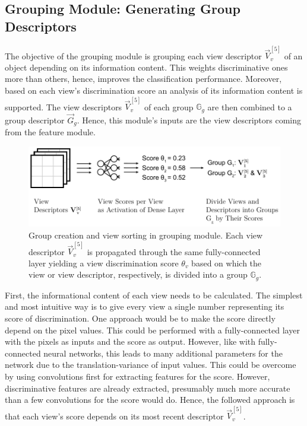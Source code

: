 \subsection{Grouping Module: Generating Group Descriptors}
\label{sec:architecture-grouping-module}
The objective of the grouping module is grouping each view descriptor $\vec{V}^{[5]}_v$ of an object depending on its information content.
This weights discriminative ones more than others, hence, improves the classification performance.
Moreover, based on each view's discrimination score an analysis of its information content is supported.
The view descriptors $\vec{V}^{[5]}_v$ of each group $\mathbb{G}_g$ are then combined to a group descriptor $\vec{G}_g$.
Hence, this module's inputs are the view descriptors coming from the feature module.
\begin{figure}
	\centering
	\includegraphics[]{images/grouping_module_groups.pdf}
	\caption{Group creation and view sorting in grouping module. Each view descriptor $\vec{V}^{[5]}_v$ is propagated through the same fully-connected layer yielding a view discrimination score $\theta_v$ based on which the view or view descriptor, respectively, is divided into a group $\mathbb{G}_g$.}
	\label{fig:grouping-module-groups}
\end{figure}
First, the informational content of each view needs to be calculated.
The simplest and most intuitive way is to give every view a single number representing its score of discrimination.
One approach would be to make the score directly depend on the pixel values.
This could be performed with a fully-connected layer with the pixels as inputs and the score as output.
However, like with fully-connected neural networks, this leads to many additional parameters for the network due to the translation-variance of input values. 
This could be overcome by using convolutions first for extracting features for the score.
However, discriminative features are already extracted, presumably much more accurate than a few convolutions for the score would do. 
Hence, the followed approach is that each view's score depends on its most recent descriptor $\vec{V}^{[5]}_v$.
